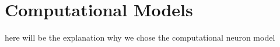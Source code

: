 \section{Computational Models}

here will be the explanation why we chose the computational neuron model